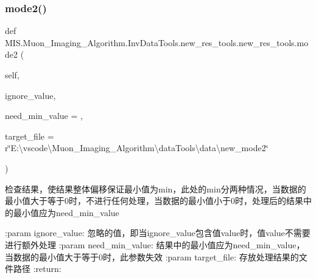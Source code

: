 \subsubsection{\texorpdfstring{mode2()}{mode2()}}
{\footnotesize\ttfamily def M\+I\+S.\+Muon\+\_\+\+Imaging\+\_\+\+Algorithm.\+Inv\+Data\+Tools.\+new\+\_\+res\+\_\+tools.\+new\+\_\+res\+\_\+tools.\+mode2 (\begin{DoxyParamCaption}\item[{}]{self,  }\item[{}]{ignore\+\_\+value,  }\item[{}]{need\+\_\+min\+\_\+value = {},  }\item[{}]{target\+\_\+file = {\ttfamily r\char`\"{}E\+:\textbackslash{}vscode\textbackslash{}Muon\+\_\+Imaging\+\_\+Algorithm\textbackslash{}dataTools\textbackslash{}data\textbackslash{}new\+\_\+mode2\char`\"{}} }\end{DoxyParamCaption})}

\begin{DoxyVerb}检查结果，使结果整体偏移保证最小值为min，此处的min分两种情况，当数据的最小值大于等于0时，不进行任何处理，当数据的最小值小于0时，处理后的结果中的最小值应为need_min_value

:param ignore_value: 忽略的值，即当ignore_value包含值value时，值value不需要进行额外处理
:param need_min_value: 结果中的最小值应为need_min_value，当数据的最小值大于等于0时，此参数失效
:param target_file: 存放处理结果的文件路径
:return:
\end{DoxyVerb}
 \mbox{\label{classMIS_1_1Muon__Imaging__Algorithm_1_1InvDataTools_1_1new__res__tools_1_1new__res__tools_a0ea3f101bb4ec0f248f57dcc838c71f3}} 
